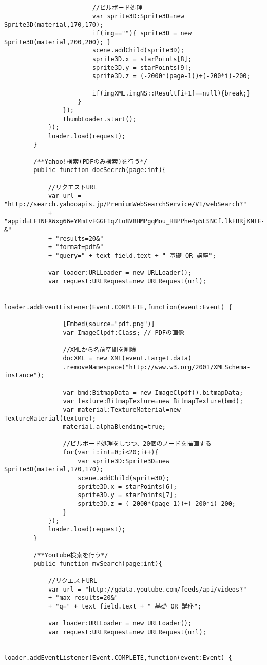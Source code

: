 {\begin{verbatim}
						//ビルボード処理
						var sprite3D:Sprite3D=new Sprite3D(material,170,170);
						if(img==""){ sprite3D = new Sprite3D(material,200,200); }
						scene.addChild(sprite3D);
						sprite3D.x = starPoints[8];
						sprite3D.y = starPoints[9];
						sprite3D.z = (-2000*(page-1))+(-200*i)-200;
						
						if(imgXML.imgNS::Result[i+1]==null){break;}
					}
				});
				thumbLoader.start();
			});
			loader.load(request);
		}
		
		/**Yahoo!検索(PDFのみ検索)を行う*/
		public function docSecrch(page:int){
			
			//リクエストURL
			var url = "http://search.yahooapis.jp/PremiumWebSearchService/V1/webSearch?"
			+ "appid=LFTNFXWxg66eYMmIvFGGF1qZLo8V8HMPgqMou_HBPPhe4p5LSNCf.lkFBRjKNtE-&"
			+ "results=20&"
			+ "format=pdf&"
			+ "query=" + text_field.text + " 基礎 OR 講座";
			
			var loader:URLLoader = new URLLoader();
			var request:URLRequest=new URLRequest(url);
			
			loader.addEventListener(Event.COMPLETE,function(event:Event) {
				
				[Embed(source="pdf.png")]
				var ImageClpdf:Class; // PDFの画像
									
				//XMLから名前空間を削除
				docXML = new XML(event.target.data)
				.removeNamespace("http://www.w3.org/2001/XMLSchema-instance");
					
				var bmd:BitmapData = new ImageClpdf().bitmapData;
				var texture:BitmapTexture=new BitmapTexture(bmd);
				var material:TextureMaterial=new TextureMaterial(texture);
				material.alphaBlending=true;
				
				//ビルボード処理をしつつ、20個のノードを描画する
				for(var i:int=0;i<20;i++){
					var sprite3D:Sprite3D=new Sprite3D(material,170,170);
					scene.addChild(sprite3D);
					sprite3D.x = starPoints[6];
					sprite3D.y = starPoints[7];
					sprite3D.z = (-2000*(page-1))+(-200*i)-200;
				}
			});
			loader.load(request);
		}
		
		/**Youtube検索を行う*/
		public function mvSearch(page:int){
			
			//リクエストURL
			var url = "http://gdata.youtube.com/feeds/api/videos?"
			+ "max-results=20&"
			+ "q=" + text_field.text + " 基礎 OR 講座";
			
			var loader:URLLoader = new URLLoader();
			var request:URLRequest=new URLRequest(url);
			
			loader.addEventListener(Event.COMPLETE,function(event:Event) {
									

\end{verbatim}}

